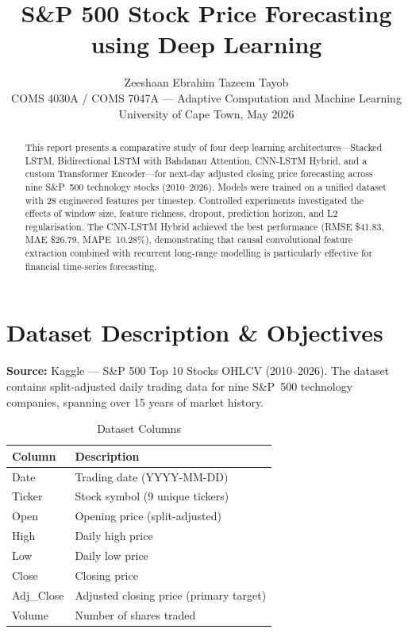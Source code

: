 \documentclass[11pt]{article}
\title{S\&P 500 Stock Price Forecasting using Deep Learning}
\author{
  Zeeshaan Ebrahim \quad {\small (2543004)} \And
  Tazeem Tayob \quad {\small (2659956)}
  \\[6pt]
  {\small COMS 4030A / COMS 7047A --- Adaptive Computation and Machine Learning} \\
  {\small University of Cape Town, May 2026}
}
\begin{document}
\maketitle

\begin{abstract}
This report presents a comparative study of four deep learning
architectures---Stacked LSTM, Bidirectional LSTM with Bahdanau
Attention, CNN-LSTM Hybrid, and a custom Transformer Encoder---for
next-day adjusted closing price forecasting across nine S\&P~500
technology stocks (2010--2026). Models were trained on a unified
dataset with 28 engineered features per timestep. Controlled
experiments investigated the effects of window size, feature richness,
dropout, prediction horizon, and L2 regularisation. The CNN-LSTM
Hybrid achieved the best performance (RMSE \$41.83, MAE \$26.79,
MAPE~10.28\%), demonstrating that causal convolutional feature
extraction combined with recurrent long-range modelling is
particularly effective for financial time-series forecasting.
\end{abstract}

\section{Dataset Description \& Objectives}

\textbf{Source:} Kaggle --- S\&P 500 Top 10 Stocks OHLCV (2010--2026).
The dataset contains split-adjusted daily trading data for nine S\&P~500
technology companies, spanning over 15 years of market history.

\begin{table}[h]
\caption{Dataset Columns}
\label{tab:dataset-cols}
\begin{tabularx}{\linewidth}{L{2.8cm} X}
\toprule
\textbf{Column} & \textbf{Description} \\
\midrule
Date        & Trading date (YYYY-MM-DD) \\
Ticker      & Stock symbol (9 unique tickers) \\
Open        & Opening price (split-adjusted) \\
High        & Daily high price \\
Low         & Daily low price \\
Close       & Closing price \\
Adj\_Close  & Adjusted closing price (primary target) \\
Volume      & Number of shares traded \\
\bottomrule
\end{tabularx}
\end{table}
\end{document}
